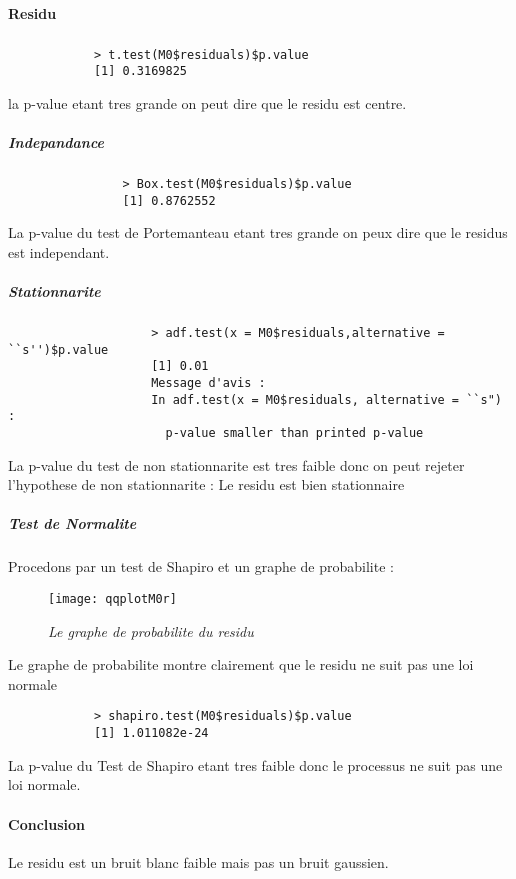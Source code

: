         \paragraph{Residu}
            \subparagraph{}
            \begin{verbatim}
            > t.test(M0$residuals)$p.value
            [1] 0.3169825
            \end{verbatim}
            la p-value etant tres grande on peut dire que le residu est
           centre. 
            \subparagraph{Indepandance}
                \begin{verbatim}
                > Box.test(M0$residuals)$p.value
                [1] 0.8762552
                \end{verbatim}
                La p-value du test de Portemanteau etant tres grande on peux dire
                que le residus est independant.
            \subparagraph{Stationnarite}
                \begin{verbatim}
                    > adf.test(x = M0$residuals,alternative = ``s'')$p.value
                    [1] 0.01
                    Message d'avis :
                    In adf.test(x = M0$residuals, alternative = ``s") :
                      p-value smaller than printed p-value
                \end{verbatim}
                La p-value du test de non  stationnarite est tres faible donc on
                peut rejeter l'hypothese de non stationnarite : Le residu est
                bien stationnaire
            \subparagraph{Test de Normalite} Procedons par un test de
            Shapiro et un graphe de probabilite :
            \begin{figure}[H]
                \centering 
                \label{fig:qqplotM0r} 
                \texttt{[image: qqplotM0r]} 
                \caption{\it Le graphe de probabilite du residu } 
            \end{figure} 

            Le graphe de probabilite montre clairement que le residu ne suit
            pas une loi normale
            \begin{verbatim}
            > shapiro.test(M0$residuals)$p.value
            [1] 1.011082e-24
            \end{verbatim}
            La p-value du Test de Shapiro etant tres faible donc le processus ne
            suit pas une loi normale.
            \paragraph{Conclusion} Le residu est un bruit blanc faible mais pas
            un bruit gaussien.

